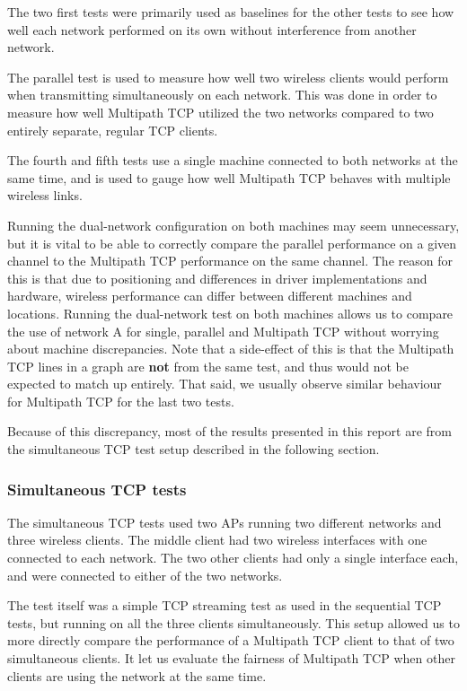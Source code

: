 The two first tests were primarily used as baselines for the other tests to see
how well each network performed on its own without interference from another
network.

The parallel test is used to measure how well two wireless clients would perform
when transmitting simultaneously on each network. This was done in order to
measure how well Multipath TCP utilized the two networks compared to two
entirely separate, regular TCP clients.

The fourth and fifth tests use a single machine connected to both networks at
the same time, and is used to gauge how well Multipath TCP behaves with multiple
wireless links.

Running the dual-network configuration on both machines may seem unnecessary,
but it is vital to be able to correctly compare the parallel performance on a
given channel to the Multipath TCP performance on the same channel. The reason
for this is that due to positioning and differences in driver implementations
and hardware, wireless performance can differ between different machines and
locations. Running the dual-network test on both machines allows us to compare
the use of network A for single, parallel and Multipath TCP without worrying
about machine discrepancies. Note that a side-effect of this is that the
Multipath TCP lines in a graph are \textbf{not} from the same test, and thus
would not be expected to match up entirely. That said, we usually observe
similar behaviour for Multipath TCP for the last two tests.

Because of this discrepancy, most of the results presented in this report are
from the simultaneous TCP test setup described in the following section.

\subsubsection{Simultaneous TCP tests}
\label{sec:met:setups:simtcp}
The simultaneous TCP tests used two APs running two different networks and three
wireless clients. The middle client had two wireless interfaces with one
connected to each network. The two other clients had only a single interface
each, and were connected to either of the two networks.

The test itself was a simple TCP streaming test as used in the sequential TCP
tests, but running on all the three clients simultaneously. This setup allowed
us to more directly compare the performance of a Multipath TCP client to that of
two simultaneous clients. It let us evaluate the fairness of Multipath TCP when
other clients are using the network at the same time.

